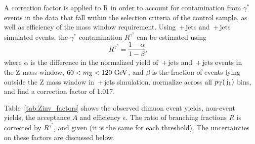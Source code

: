 A correction factor is applied to R in order to account for contamination from $\gamma^{*}$ events in the data that fall within the selection criteria of the control sample, as well as efficiency of the mass window requirement. 
Using \zmumubr{}\,+\,jets and \znunubr{}\,+\,jets simulated events, 
the $\gamma^{*}$ contamination $R^{\gamma^{*}}$ can be estimated using
   \begin{equation}
   R^{\gamma^{*}} = \frac{1-\alpha}{1-\beta} ,
   \end{equation}
where $\alpha$ is the difference in the normalized yield of \zmumubr{}\,+\,jets and \znunubr{}\,+\,jets events in the Z mass window, $60< m_{\mathrm{Z}{}} < 120~\mathrm{GeV}$, and
   $\beta$ is the fraction of events lying outside the Z mass window in \znunubr{}\,+\,jets simulation.
 normalize across all $p_{\text{T}}(\,\mathrm{j}_1)$ bins, and find a correction factor of 1.017.


Table~\ref{tab:Zinv_factors} shows the observed dimuon event yields, non-\zmumubr event yields, the acceptance $A$ and efficiency $\epsilon$. The ratio of branching fractions $R$ is corrected by $R^{\gamma^{*}}$, and given (it is the same for each threshold). 
The uncertainties on these factors are discussed below. 



